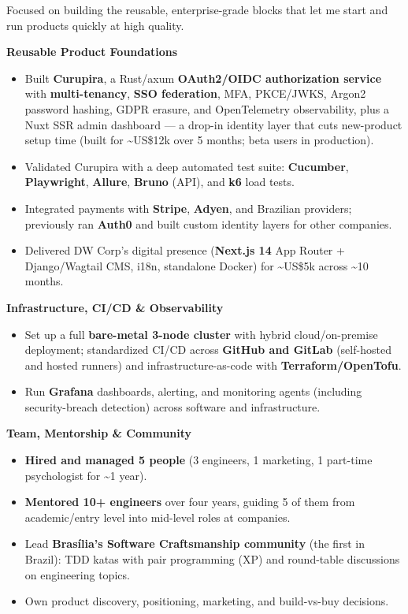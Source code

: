 \documentclass[10pt,a4paper]{altacv}
\begin{document}
Focused on building the reusable, enterprise-grade blocks that let me start and run products quickly at high quality.

\textbf{Reusable Product Foundations}
\begin{itemize}
    \setlength{\itemindent}{0.5em}
    \item[--] Built \textbf{Curupira}, a Rust/axum \textbf{OAuth2/OIDC authorization service} with \textbf{multi-tenancy}, \textbf{SSO federation}, MFA, PKCE/JWKS, Argon2 password hashing, GDPR erasure, and OpenTelemetry observability, plus a Nuxt SSR admin dashboard — a drop-in identity layer that cuts new-product setup time (built for \textasciitilde US\$12k over 5 months; beta users in production).
    \item[--] Validated Curupira with a deep automated test suite: \textbf{Cucumber}, \textbf{Playwright}, \textbf{Allure}, \textbf{Bruno} (API), and \textbf{k6} load tests.
    \item[--] Integrated payments with \textbf{Stripe}, \textbf{Adyen}, and Brazilian providers; previously ran \textbf{Auth0} and built custom identity layers for other companies.
    \item[--] Delivered DW Corp's digital presence (\textbf{Next.js 14} App Router + Django/Wagtail CMS, i18n, standalone Docker) for \textasciitilde US\$5k across \textasciitilde10 months.
\end{itemize}

\textbf{Infrastructure, CI/CD \& Observability}
\begin{itemize}
    \setlength{\itemindent}{0.5em}
    \item[--] Set up a full \textbf{bare-metal 3-node cluster} with hybrid cloud/on-premise deployment; standardized CI/CD across \textbf{GitHub and GitLab} (self-hosted and hosted runners) and infrastructure-as-code with \textbf{Terraform/OpenTofu}.
    \item[--] Run \textbf{Grafana} dashboards, alerting, and monitoring agents (including security-breach detection) across software and infrastructure.
\end{itemize}

\textbf{Team, Mentorship \& Community}
\begin{itemize}
    \setlength{\itemindent}{0.5em}
    \item[--] \textbf{Hired and managed 5 people} (3 engineers, 1 marketing, 1 part-time psychologist for \textasciitilde1 year).
    \item[--] \textbf{Mentored 10+ engineers} over four years, guiding 5 of them from academic/entry level into mid-level roles at companies.
    \item[--] Lead \textbf{Brasília's Software Craftsmanship community} (the first in Brazil): TDD katas with pair programming (XP) and round-table discussions on engineering topics.
    \item[--] Own product discovery, positioning, marketing, and build-vs-buy decisions.
\end{itemize}
\end{document}
